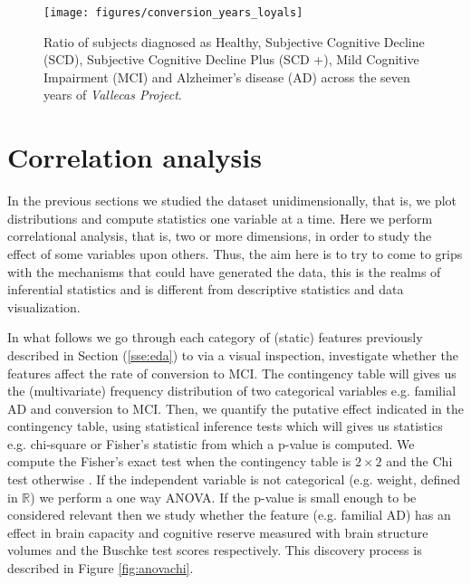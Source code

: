 \documentclass[11pt]{article}
\theoremstyle{definition}
\theoremstyle{remark}
\begin{document}
\begin{figure}[H]
        \centering
        \texttt{[image: figures/conversion\_years\_loyals]}
        \caption{Ratio of subjects diagnosed as Healthy, Subjective Cognitive Decline (SCD), Subjective Cognitive Decline Plus (SCD +), Mild Cognitive Impairment (MCI) and Alzheimer's disease (AD) across the seven years of \emph{Vallecas Project}.} 
        \label{fig:diag1}
\end{figure}


\section{Correlation analysis}
\label{se:met}

In the previous sections we studied the dataset unidimensionally, that is, we plot distributions and compute statistics one variable at a time. Here we perform correlational analysis, that is, two or more dimensions, in order to study the effect of some variables upon others. Thus, the aim here is to try to come to grips with the mechanisms that could have generated the data, this is the realms of inferential statistics and is different from descriptive statistics and data visualization. 

In what follows we go through each category of (static) features previously described in Section (\ref{sse:eda}) to via a visual inspection, investigate whether the features affect the rate of conversion to MCI. The contingency table \cite{everitt1992analysis} will gives us the (multivariate) frequency distribution of two categorical variables e.g. familial AD and conversion to MCI. Then, we quantify the putative effect indicated in the contingency table, using statistical inference tests which will gives us statistics e.g. chi-square or Fisher's statistic from which a p-value is computed. 
We compute the Fisher's exact test when the contingency table is $2 \times 2$ and the Chi test otherwise \cite{scipy2010}. If the independent variable is not categorical (e.g. weight, defined in $\mathbb{R}$) we perform a one way ANOVA.
If the p-value is small enough to be considered relevant then we study whether the feature (e.g. familial AD) has an effect in brain capacity and cognitive reserve measured with brain structure volumes and the Buschke test scores respectively.
This discovery process is described in Figure \ref{fig:anovachi}. 
\end{document}
